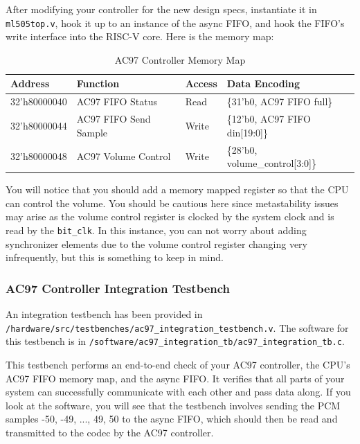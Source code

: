 \documentclass[11pt]{article}
\begin{document}
After modifying your controller for the new design specs, instantiate it in \verb|ml505top.v|, hook it up to an instance of the async FIFO, and hook the FIFO's write interface into the RISC-V core. Here is the memory map:

\begin{table}[hbt]
	\begin{center}
		\caption{AC97 Controller Memory Map}
		\begin{tabular}{l l l l}
			\toprule
			\textbf{Address} & \textbf{Function} & \textbf{Access} & \textbf{Data Encoding}\\
			\midrule
			32'h80000040 & AC97 FIFO Status & Read & \{31'b0, AC97 FIFO full\} \\
			32'h80000044 & AC97 FIFO Send Sample & Write & \{12'b0, AC97 FIFO din[19:0]\} \\
			32'h80000048 & AC97 Volume Control & Write & \{28'b0, volume\_control[3:0]\}\\
			\bottomrule
		\end{tabular}
	\end{center}
\end{table}

You will notice that you should add a memory mapped register so that the CPU can control the volume. You should be cautious here since metastability issues may arise as the volume control register is clocked by the system clock and is read by the \verb|bit_clk|. In this instance, you can not worry about adding synchronizer elements due to the volume control register changing very infrequently, but this is something to keep in mind.

\subsubsection{AC97 Controller Integration Testbench}
An integration testbench has been provided in \verb|/hardware/src/testbenches/ac97_integration_testbench.v|. The software for this testbench is in \verb|/software/ac97_integration_tb/ac97_integration_tb.c|. 

This testbench performs an end-to-end check of your AC97 controller, the CPU's AC97 FIFO memory map, and the async FIFO. It verifies that all parts of your system can successfully communicate with each other and pass data along. If you look at the software, you will see that the testbench involves sending the PCM samples -50, -49, ..., 49, 50 to the async FIFO, which should then be read and transmitted to the codec by the AC97 controller.
\end{document}
